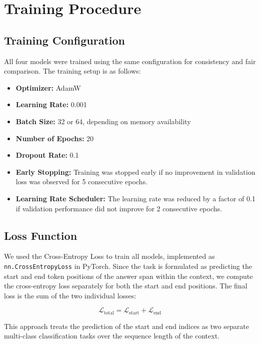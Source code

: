 \documentclass[runningheads]{llncs}
\begin{document}
\section{Training Procedure}
\subsection{Training Configuration}

All four models were trained using the same configuration for consistency and fair comparison. The training setup is as follows:

\begin{itemize}
    \item \textbf{Optimizer:} AdamW
    \item \textbf{Learning Rate:} 0.001
    \item \textbf{Batch Size:} 32 or 64, depending on memory availability
    \item \textbf{Number of Epochs:} 20
    \item \textbf{Dropout Rate:} 0.1
    \item \textbf{Early Stopping:} Training was stopped early if no improvement in validation loss was observed for 5 consecutive epochs.
    \item \textbf{Learning Rate Scheduler:} The learning rate was reduced by a factor of 0.1 if validation performance did not improve for 2 consecutive epochs.
\end{itemize}

\subsection{Loss Function}

We used the Cross-Entropy Loss to train all models, implemented as \texttt{nn.CrossEntropyLoss} in PyTorch. Since the task is formulated as predicting the start and end token positions of the answer span within the context, we compute the cross-entropy loss separately for both the start and end positions. The final loss is the sum of the two individual losses:

\begin{equation}
\mathcal{L}_{\text{total}} = \mathcal{L}_{\text{start}} + \mathcal{L}_{\text{end}}
\end{equation}

This approach treats the prediction of the start and end indices as two separate multi-class classification tasks over the sequence length of the context.
\end{document}
